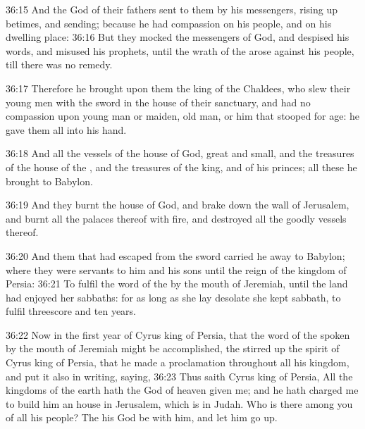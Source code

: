 36:15 And the \LORD God of their fathers sent to them by his messengers, rising up betimes, and sending; because he had compassion on his people, and on his dwelling place: 36:16 But they mocked the messengers of God, and despised his words, and misused his prophets, until the wrath of the \LORD arose against his people, till there was no remedy.

36:17 Therefore he brought upon them the king of the Chaldees, who slew their young men with the sword in the house of their sanctuary, and had no compassion upon young man or maiden, old man, or him that stooped for age: he gave them all into his hand.

36:18 And all the vessels of the house of God, great and small, and the treasures of the house of the \LORD, and the treasures of the king, and of his princes; all these he brought to Babylon.

36:19 And they burnt the house of God, and brake down the wall of Jerusalem, and burnt all the palaces thereof with fire, and destroyed all the goodly vessels thereof.

36:20 And them that had escaped from the sword carried he away to Babylon; where they were servants to him and his sons until the reign of the kingdom of Persia: 36:21 To fulfil the word of the \LORD by the mouth of Jeremiah, until the land had enjoyed her sabbaths: for as long as she lay desolate she kept sabbath, to fulfil threescore and ten years.

36:22 Now in the first year of Cyrus king of Persia, that the word of the \LORD spoken by the mouth of Jeremiah might be accomplished, the \LORD stirred up the spirit of Cyrus king of Persia, that he made a proclamation throughout all his kingdom, and put it also in writing, saying, 36:23 Thus saith Cyrus king of Persia, All the kingdoms of the earth hath the \LORD God of heaven given me; and he hath charged me to build him an house in Jerusalem, which is in Judah. Who is there among you of all his people?  The \LORD his God be with him, and let him go up.

